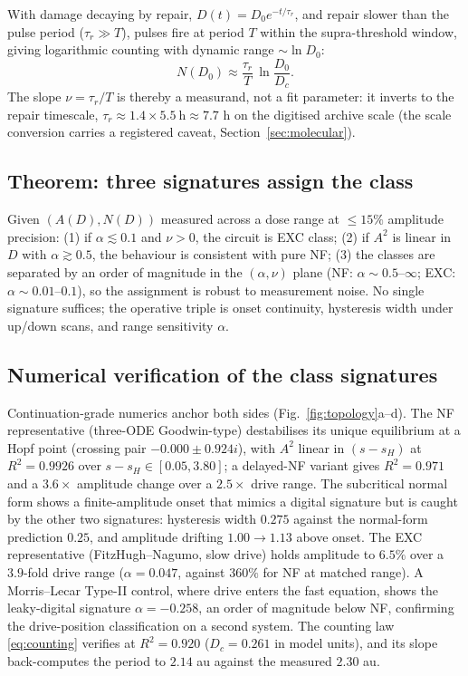 \documentclass[11pt,a4paper]{article}
\begin{document}
With damage decaying by repair, $D(t)=D_0e^{-t/\tau_r}$, and repair slower than the pulse period ($\tau_r\gg T$), pulses fire at period $T$ within the supra-threshold window, giving logarithmic counting with dynamic range $\sim\ln D_0$:
\begin{equation}
N(D_0)\approx\frac{\tau_r}{T}\,\ln\frac{D_0}{D_c}.
\label{eq:counting}
\end{equation}
The slope $\nu=\tau_r/T$ is thereby a measurand, not a fit parameter: it inverts to the repair timescale, $\tau_r\approx1.4\times5.5\ \mathrm{h}\approx7.7$ h on the digitised archive scale (the scale conversion carries a registered caveat, Section~\ref{sec:molecular}).

\subsection{Theorem: three signatures assign the class}

Given $(A(D),N(D))$ measured across a dose range at $\le15\%$ amplitude precision: (1) if $\alpha\lesssim0.1$ and $\nu>0$, the circuit is EXC class; (2) if $A^2$ is linear in $D$ with $\alpha\gtrsim0.5$, the behaviour is consistent with pure NF; (3) the classes are separated by an order of magnitude in the $(\alpha,\nu)$ plane (NF: $\alpha\sim0.5$--$\infty$; EXC: $\alpha\sim0.01$--$0.1$), so the assignment is robust to measurement noise. No single signature suffices; the operative triple is onset continuity, hysteresis width under up/down scans, and range sensitivity $\alpha$.

\subsection{Numerical verification of the class signatures}

Continuation-grade numerics anchor both sides (Fig.~\ref{fig:topology}a--d). The NF representative (three-ODE Goodwin-type) destabilises its unique equilibrium at a Hopf point (crossing pair $-0.000\pm0.924i$), with $A^2$ linear in $(s-s_H)$ at $R^2=0.9926$ over $s-s_H\in[0.05,3.80]$; a delayed-NF variant gives $R^2=0.971$ and a $3.6\times$ amplitude change over a $2.5\times$ drive range. The subcritical normal form shows a finite-amplitude onset that mimics a digital signature but is caught by the other two signatures: hysteresis width $0.275$ against the normal-form prediction $0.25$, and amplitude drifting $1.00\to1.13$ above onset. The EXC representative (FitzHugh--Nagumo, slow drive) holds amplitude to $6.5\%$ over a $3.9$-fold drive range ($\alpha=0.047$, against $360\%$ for NF at matched range). A Morris--Lecar Type-II control, where drive enters the fast equation, shows the leaky-digital signature $\alpha=-0.258$, an order of magnitude below NF, confirming the drive-position classification on a second system. The counting law \eqref{eq:counting} verifies at $R^2=0.920$ ($D_c=0.261$ in model units), and its slope back-computes the period to $2.14$ au against the measured $2.30$ au.
\end{document}
